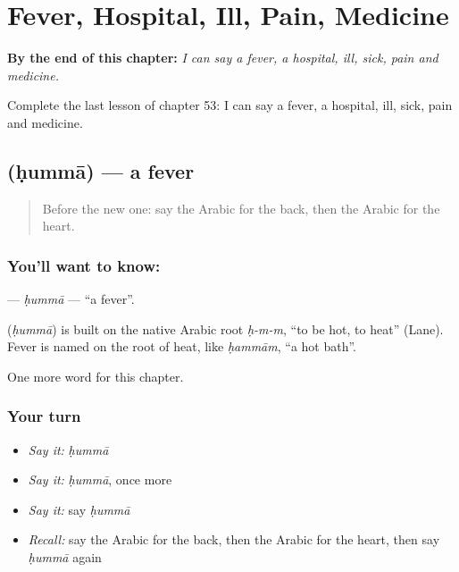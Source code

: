 
\chapter{Fever, Hospital, Ill, Pain, Medicine}
\label{ch:ar-fever-hospital-ill-pain-medicine}

\begin{chapteropening}
\textbf{By the end of this chapter:} \emph{I can say a fever, a hospital, ill, sick, pain and medicine.}

Complete the last lesson of chapter 53: I can say a fever, a hospital, ill, sick, pain and medicine.
\end{chapteropening}

\section[\texorpdfstring{\ar{حمى} (ḥummā)}{حمى (ḥummā)}]{ (ḥummā) — a fever}

\label{lesson:AR-C53-humma}



\begin{quote}
Before the new one: say the Arabic for the back, then the Arabic for the heart.
\end{quote}

\subsection*{You'll want to know: }
\textbf{} — \emph{ḥummā} — \textquotedblleft{}a fever\textquotedblright{}.

\begin{cousinweb}
\textbf{} (\emph{ḥummā}) is built on the native Arabic root \emph{ḥ-m-m}, \textquotedblleft{}to be hot, to heat\textquotedblright{} (Lane). Fever is named on the root of heat, like \emph{ḥammām}, \textquotedblleft{}a hot bath\textquotedblright{}.
\end{cousinweb}

\begin{grammarlens}[title={What you've built}]
One more word for this chapter.
\end{grammarlens}

\subsection*{Your turn}
\begin{itemize}
\raggedright
  \item \emph{Say it:} \emph{ḥummā}
  \item \emph{Say it:} \emph{ḥummā}, once more
  \item \emph{Say it:} say \emph{ḥummā}
  \item \emph{Recall:} say the Arabic for the back, then the Arabic for the heart, then say \emph{ḥummā} again
\end{itemize}

